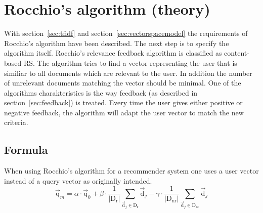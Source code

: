 
\section{Rocchio's algorithm (theory)}
\label{sec:rocchio}
\iffalse
Beschreibung des Rocchio algorithmus
\fi
With section~\ref{sec:tfidf} and section~\ref{sec:vectorspacemodel} the requirements of Rocchio's algorithm have been described.\citep[p.~178]{manning:2009}
The next step is to specify the algorithm itself.
Rocchio's relevance feedback algorithm is classified as content-based RS.\citep[p.~92]{lops:2011}
The algorithm tries to find a vector representing the user that is similiar to all documents which are relevant to the user.
In addition the number of unrelevant documents matching the vector should be minimal.\citep[p.~178-181]{manning:2009}
One of the algorithms charakteristics is the way feedback (as described in section~\ref{sec:feedback}) is treated.
Every time the user gives either positive or negative feedback, the algorithm will adapt the user vector to match the new criteria.\citep[p.~92-93]{lops:2011}

\subsection{Formula}
When using Rocchio's algorithm for a recommender system one uses a user vector instead of a query vector as originally intended.
\begin{equation}
    \vec{\text{q}}_m =
        \alpha \cdot \vec{\text{q}}_0
        + \beta \cdot \frac{1}{|\text{D}_\text{r}|}\sum_{\vec{\text{d}}_j\in \text{D}_\text{r}} \vec{\text{d}}_j
        - \gamma \cdot \frac{1}{|\text{D}_\text{nr}|}\sum_{\vec{\text{d}}_j\in \text{D}_\text{nr}} \vec{\text{d}}_j
\end{equation}
